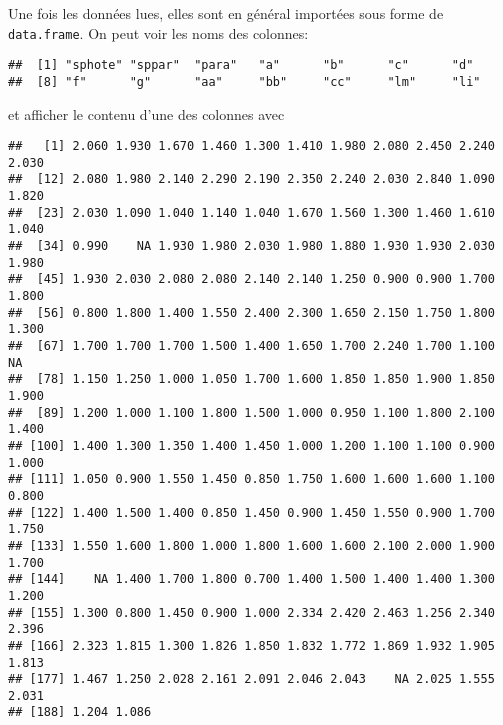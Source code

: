 Une fois les données lues, elles sont en général importées sous forme de \texttt{data.frame}.
On peut voir les noms des colonnes:

\begin{knitrout}
\color{fgcolor}\begin{kframe}
\begin{flushleft}
\ttfamily\noindent
{}\hlkeyword{(}\hlkeyword{)}\mbox{}
\normalfont
\end{flushleft}
\begin{verbatim}
##  [1] "sphote" "sppar"  "para"   "a"      "b"      "c"      "d"     
##  [8] "f"      "g"      "aa"     "bb"     "cc"     "lm"     "li"    
\end{verbatim}
\end{kframe}
\end{knitrout}


\noindent et afficher le contenu d'une des colonnes avec

\begin{knitrout}
\color{fgcolor}\begin{kframe}
\begin{flushleft}
\ttfamily\noindent
{}\hlkeyword{\usebox{\hlnormalsizeboxdollar}}\mbox{}
\normalfont
\end{flushleft}
\begin{verbatim}
##   [1] 2.060 1.930 1.670 1.460 1.300 1.410 1.980 2.080 2.450 2.240 2.030
##  [12] 2.080 1.980 2.140 2.290 2.190 2.350 2.240 2.030 2.840 1.090 1.820
##  [23] 2.030 1.090 1.040 1.140 1.040 1.670 1.560 1.300 1.460 1.610 1.040
##  [34] 0.990    NA 1.930 1.980 2.030 1.980 1.880 1.930 1.930 2.030 1.980
##  [45] 1.930 2.030 2.080 2.080 2.140 2.140 1.250 0.900 0.900 1.700 1.800
##  [56] 0.800 1.800 1.400 1.550 2.400 2.300 1.650 2.150 1.750 1.800 1.300
##  [67] 1.700 1.700 1.700 1.500 1.400 1.650 1.700 2.240 1.700 1.100    NA
##  [78] 1.150 1.250 1.000 1.050 1.700 1.600 1.850 1.850 1.900 1.850 1.900
##  [89] 1.200 1.000 1.100 1.800 1.500 1.000 0.950 1.100 1.800 2.100 1.400
## [100] 1.400 1.300 1.350 1.400 1.450 1.000 1.200 1.100 1.100 0.900 1.000
## [111] 1.050 0.900 1.550 1.450 0.850 1.750 1.600 1.600 1.600 1.100 0.800
## [122] 1.400 1.500 1.400 0.850 1.450 0.900 1.450 1.550 0.900 1.700 1.750
## [133] 1.550 1.600 1.800 1.000 1.800 1.600 1.600 2.100 2.000 1.900 1.700
## [144]    NA 1.400 1.700 1.800 0.700 1.400 1.500 1.400 1.400 1.300 1.200
## [155] 1.300 0.800 1.450 0.900 1.000 2.334 2.420 2.463 1.256 2.340 2.396
## [166] 2.323 1.815 1.300 1.826 1.850 1.832 1.772 1.869 1.932 1.905 1.813
## [177] 1.467 1.250 2.028 2.161 2.091 2.046 2.043    NA 2.025 1.555 2.031
## [188] 1.204 1.086
\end{verbatim}
\end{kframe}
\end{knitrout}


